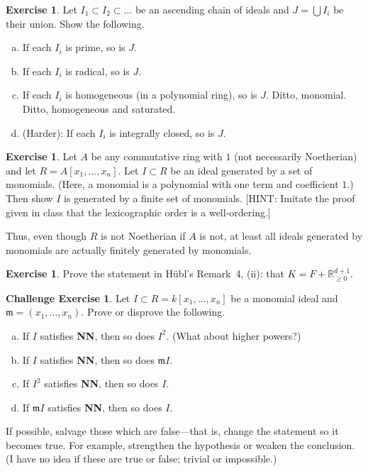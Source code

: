 \documentclass{amsart}
\theoremstyle{plain}
\theoremstyle{definition}
\newtheorem{exercise}[theorem]{Exercise}
\newtheorem{chexercise}[theorem]{Challenge Exercise}
\theoremstyle{definition}
\newcommand{\m}{\mathfrak{m}}
\newcommand{\R}{\mathbb{R}}
\begin{document}
\begin{exercise}
Let $I_1 \subset I_2 \subset \dots$ be an ascending chain of ideals
and $J = \bigcup I_i$ be their union.
Show the following.
\begin{enumerate}[a.]
\item If each $I_i$ is prime, so is $J$.
\item If each $I_i$ is radical, so is $J$.
\item If each $I_i$ is homogeneous (in a polynomial ring), so is $J$.
Ditto, monomial. Ditto, homogeneous and saturated.
\item (Harder): If each $I_i$ is integrally closed, so is $J$.
\end{enumerate}
\end{exercise}


\begin{exercise}
Let $A$ be any commutative ring with $1$ (not necessarily Noetherian)
and let $R = A[x_1,\dots,x_n]$.
Let $I \subset R$ be an ideal generated by a set of monomials.
(Here, a monomial is a polynomial with one term and coefficient $1$.)
Then show $I$ is generated by a finite set of monomials.
[HINT: Imitate the proof given in class that the lexicographic order
is a well-ordering.]

Thus, even though $R$ is not Noetherian if $A$ is not, at least all
ideals generated by monomials are actually finitely generated by monomials.
\end{exercise}


\begin{exercise}
Prove the statement in H\"ubl's Remark~4, (ii): that $K = F + \R_{\geq 0}^{d+1}$.
\end{exercise}



\begin{chexercise}
Let $I \subset R = k[x_1,\dots,x_n]$ be a monomial ideal and $\m = (x_1,\dots,x_n)$.
Prove or disprove the following.
\begin{enumerate}[a.]
\item If $I$ satisfies \textbf{NN}, then so does $I^2$. (What about higher powers?)
\item If $I$ satisfies \textbf{NN}, then so does $\m I$.
\item If $I^2$ satisfies \textbf{NN}, then so does $I$.
\item If $\m I$ satisfies \textbf{NN}, then so does $I$.
\end{enumerate}
If possible, salvage those which are false---that is, change the statement so it becomes true.
For example, strengthen the hypothesis or weaken the conclusion.
(I have no idea if these are true or false; trivial or impossible.)
\end{chexercise}
\end{document}
